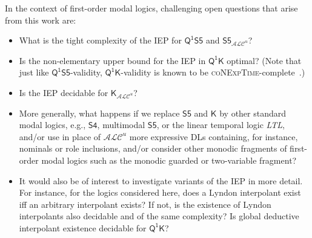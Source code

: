 \documentclass{lmcs} %
\theoremstyle{plain}\newtheorem{satz}[thm]{Satz} %
\newcommand{\nz}[1]{\textcolor{blue}{\bf!}%
	\marginpar[\parbox{15mm}{\raggedleft\scriptsize\textcolor{blue}{#1}}]%
	{\parbox{15mm}{\raggedright\scriptsize\textcolor{blue}{#1}}}}
\newcommand{\LTL}{\textsl{LTL}}
\newcommand{\FOMK}{\ensuremath{\mathsf{Q^1K}}}
\newcommand{\FOMS}{\ensuremath{\mathsf{Q^1S5}}}
\newcommand{\ALCIOS}{\ensuremath{\mathsf{S5}_{\mathcal{ALC}^u}}}
\begin{document}
%

In the context of first-order modal logics, 
challenging open questions that arise from this work are: 
%
\begin{itemize}
\item[--] What is the tight complexity of the IEP for \FOMS{} and $\ALCIOS$? 
%
\item[--] Is the non-elementary upper bound for the IEP in \FOMK{} optimal? (Note that just like \FOMS-validity, \FOMK-validity is known to be \textsc{coNExpTime}-complete~\cite{DBLP:journals/logcom/Marx99}.)
%
\item[--] Is the IEP decidable for $\mathsf{K}_{\mathcal{ALC}^{u}}$?
%
\item[--] More generally, what happens if we replace $\mathsf{S5}$ and $\mathsf{K}$ by other standard modal logics, e.g., $\mathsf{S4}$, multimodal $\mathsf{S5}$, or the linear temporal logic \LTL, and/or use in place of $\mathcal{ALC}^{u}$ more expressive DLs containing, for instance, nominals or role inclusions, and/or consider other monodic fragments of first-order modal logics such as the monodic guarded or two-variable fragment?
\item[--] It would also be of interest to investigate variants of the IEP in more detail. For instance, for the logics considered here, does a Lyndon interpolant exist iff an arbitrary interpolant exists? If not, is the existence of Lyndon interpolants also decidable and of the same complexity? Is global deductive interpolant existence decidable for \FOMK{}? 
\end{itemize}
%
\end{document}
